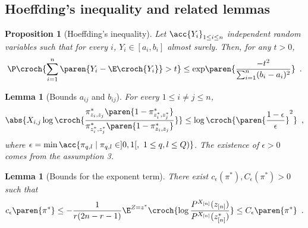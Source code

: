 \documentclass[11pt]{article}
\newtheorem{prop}[thm]{Proposition}
\newtheorem{lem}[thm]{Lemma}
\newcommand{\Xn}{X_{[n]}}
\newcommand{\zn}{z_{[n]}}
\newcommand{\PXn}{P^{\Xn}}
\begin{document}
\subsection{Hoeffding's inequality and related lemmas}
\begin{prop}[Hoeffding's inequality] \label{prop.Hoeffding.inequality}
        Let $\acc{Y_i}_{1\leq i\leq n}$ independent random variables such that for every $i$, $Y_i\in [a_i,b_i]$ almost surely.
%
Then, for any $t>0$,
\begin{align*}
        \P\croch{\sum_{i=1}^n \paren{Y_i-\E\croch{Y_i}} > t} \leq \mathrm{exp}\paren{\frac{-t^2}{\sum_{i=1}^n(b_i-a_i)^2}}\enspace.
\end{align*}
\end{prop}

\begin{lem}[Bounds $a_{ij}$ and $b_{ij}$]\label{lem.Hoeffding.bound}
For every $1 \leq i\neq j \leq n$,
\begin{align*}
        \abs{X_{i,j} \log\croch{\frac{\pi^*_{z_i,z_j}\paren{1-\pi^*_{z^*_i,z^*_j}}}{\pi^*_{z^*_i,z^*_j}\paren{1-\pi^*_{z_i,z_j}}}}} \leq
\log \croch{ \paren{ \frac{1-\epsilon}{\epsilon}}^2 }\enspace,
\end{align*}
where $\epsilon=\min\acc{\pi_{q,l} \mid \pi_{q,l}\in]0,1[,\ 1\leq q,l\leq Q)}$. The existence of $\epsilon>0$ comes from the assumption 3.
\end{lem}


\begin{lem}[Bounds for the exponent term]\label{lem.Hoeffding.Expectation}
There exist $c_{\epsilon}(\pi^*),C_{\epsilon}(\pi^*)>0$ such that
\begin{align*}
         c_{\epsilon}\paren{\pi^*} \leq -\frac{1}{r(2n-r-1)}\E^{Z=z^*} \croch{ \log \frac{\PXn(\zn)}{\PXn(\zn^*)} } \leq C_{\epsilon}\paren{\pi^*}\enspace.
\end{align*}

\end{lem}
\end{document}
